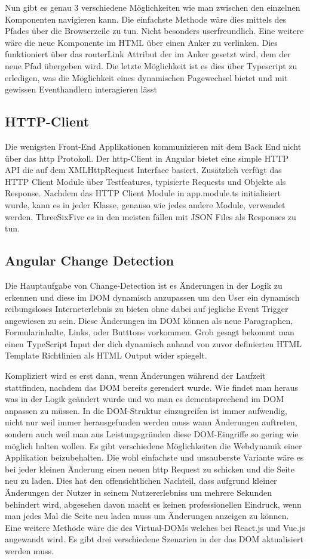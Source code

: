 Nun gibt es genau 3 verschiedene Möglichkeiten wie man zwischen den einzelnen Komponenten navigieren kann. Die einfachste Methode wäre dies mittels des Pfades über die Browserzeile zu tun. Nicht besonders userfreundlich. Eine weitere wäre die neue Komponente im HTML über einen Anker zu verlinken. Dies funktioniert über das routerLink Attribut der im Anker gesetzt wird, dem der neue Pfad übergeben wird. Die letzte Möglichkeit ist es dies über Typescript zu erledigen, was die Möglichkeit eines dynamischen Pagewechsel bietet und mit gewissen Eventhandlern interagieren lässt 
\subsection{HTTP-Client}
Die wenigsten Front-End Applikationen kommunizieren mit dem Back End nicht über das http Protokoll. Der http-Client\cite{HttpClient} in Angular bietet eine simple HTTP API die auf dem XMLHttpRequest Interface basiert. Zusätzlich verfügt das HTTP Client Module über Testfeatures, typisierte Requests und Objekte als Response. Nachdem das HTTP Client Module in app.module.ts initialisiert wurde, kann es in jeder Klasse, genauso wie jedes andere Module, verwendet werden. ThreeSixFive es in den meisten fällen mit JSON Files als Responses zu tun.
\subsection{Angular Change Detection}
Die Hauptaufgabe von Change-Detection\cite{AngularChangeDetectionExplained} ist es Änderungen in der Logik zu erkennen und diese im DOM dynamisch anzupassen um den User ein dynamisch reibungsloses Interneterlebnis zu bieten ohne dabei auf jegliche Event Trigger angewiesen zu sein. Diese Änderungen im DOM können als neue Paragraphen, Formularinhalte, Links, oder Butttons vorkommen. Grob gesagt bekommt man einen TypeScript Input der dich dynamisch anhand von zuvor definierten HTML Template Richtlinien als HTML Output wider spiegelt.

Kompliziert wird es erst dann, wenn Änderungen während der Laufzeit stattfinden, nachdem das DOM bereits gerendert wurde. Wie findet man heraus was in der Logik geändert wurde und wo man es dementsprechend im DOM anpassen zu müssen. In die DOM-Struktur einzugreifen ist immer aufwendig, nicht nur weil immer herausgefunden werden muss wann Änderungen auftreten, sondern auch weil man aus Leistungsgründen diese DOM-Eingriffe so gering wie möglich halten wollen.
Es gibt verschiedene Möglichkeiten die Webdynamik einer Applikation beizubehalten. Die wohl einfachste und unsauberste Variante wäre es bei jeder kleinen Änderung einen neuen http Request zu schicken und die Seite neu zu laden. Dies hat den offensichtlichen Nachteil, dass aufgrund kleiner Änderungen der Nutzer in seinem Nutzererlebniss um mehrere Sekunden behindert wird, abgesehen davon macht es keinen professionellen Eindruck, wenn man jedes Mal die Seite neu laden muss um Änderungen anzeigen zu können. Eine weitere Methode wäre die des Virtual-DOMs welches bei React.js und Vue.js angewandt wird.
Es gibt drei verschiedene Szenarien in der das DOM aktualisiert werden muss.

